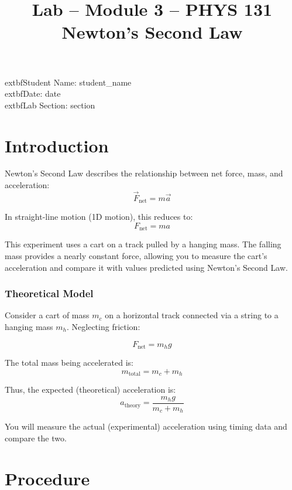 \documentclass[12pt]{article}
\begin{document}
\title{Lab -- Module 3 -- PHYS 131\\[0.5em]Newton's Second Law}
\date{}
\maketitle

	extbf{Student Name:} {{ student_name }}\\ %
	extbf{Date:} {{ date }}\\ %
	extbf{Lab Section:} {{ section }}\\[1em] %

\section*{Introduction}

Newton's Second Law describes the relationship between net force, mass, and acceleration:
\[
\vec{F}_{\text{net}} = m \vec{a}
\]

In straight-line motion (1D motion), this reduces to:
\[
F_{\text{net}} = ma
\]

This experiment uses a cart on a track pulled by a hanging mass. The falling mass provides a nearly constant force, allowing you to measure the cart's acceleration and compare it with values predicted using Newton's Second Law.

\subsubsection*{Theoretical Model}

Consider a cart of mass $m_c$ on a horizontal track connected via a string to a hanging mass $m_h$. Neglecting friction:

\[
F_{\text{net}} = m_h g
\]

The total mass being accelerated is:
\[
m_{\text{total}} = m_c + m_h
\]

Thus, the expected (theoretical) acceleration is:
\[
a_{\text{theory}} = \frac{m_h g}{m_c + m_h}
\]

You will measure the actual (experimental) acceleration using timing data and compare the two.

\section*{Procedure}
\end{document}
